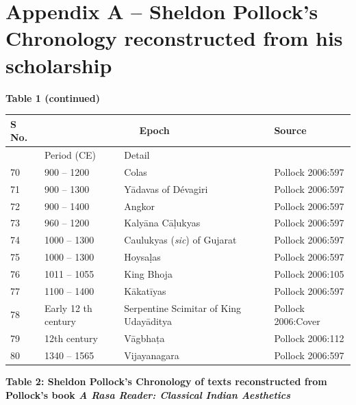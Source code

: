 \section*{Appendix A -- Sheldon Pollock’s Chronology reconstructed from his scholarship}

\textbf{Table 1 (continued)}

\begin{longtable}{|l|p{2.5cm}|p{2.5cm}|p{2.4cm}|}
\hline
S No. & \multicolumn{2}{c|}{Epoch} & Source \\
\hline
  & Period (CE) & Detail &   \\
\hline
70 & 900 – 1200 & Colas & Pollock 2006:597 \\
\hline
71 & 900 – 1300 & Yādavas of Dévagiri & Pollock 2006:597 \\
\hline
72 & 900 – 1400 & Angkor & Pollock 2006:597 \\
\hline
73 & 960 – 1200 & Kalyāna Cāḷukyas & Pollock 2006:597 \\
\hline
74 & 1000 – 1300 & Caulukyas (\textit{sic}) of Gujarat & Pollock 2006:597 \\
\hline
75 & 1000 – 1300 & Hoysaḷas & Pollock 2006:597 \\
\hline
76 & 1011 – 1055 & King Bhoja & Pollock 2006:105 \\
\hline
77 & 1100 – 1400 & Kākatīyas & Pollock 2006:597 \\
\hline
78 & Early 12 th   century & Serpentine Scimitar of King Udayāditya & Pollock 2006:Cover \\
\hline
79 & 12th century & Vāgbhaṭa & Pollock 2006:112 \\
\hline
80 & 1340 – 1565 & Vijayanagara & Pollock 2006:597 \\
\hline
\end{longtable}

\textbf{Table 2: Sheldon Pollock’s Chronology of texts reconstructed from Pollock’s book \textit{A Rasa Reader: Classical Indian Aesthetics}}

